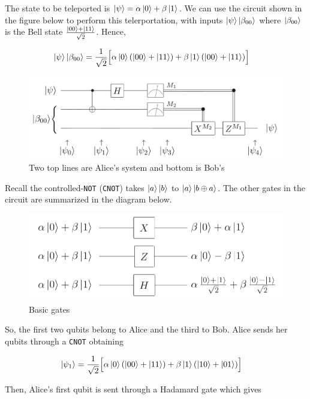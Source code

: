 \documentclass[11pt]{article}
\newcommand\0{\mathbf{0}}
\newcommand\<{\langle}
\renewcommand\>{\rangle}
\begin{document}
The state to be teleported is $\ket{\psi} = \alpha\ket{0} + \beta\ket{1}$. We can use the circuit shown in the figure below to perform this telerportation, with inputs $\ket{\psi} \ket{\beta_{00}}$ where $\ket{\beta_{00}}$ is the Bell state $\frac{\ket{00} + \ket{11} }{\sqrt{2}}$. Hence,

\begin{align*}
	\ket{\psi} \ket{\beta_{00}} &= \frac{1}{\sqrt{2}}\Big[\alpha\ket{0}(\ket{00} + \ket{11}) + \beta\ket{1}(\ket{00} + \ket{11})\Big]
\end{align*}


\begin{figure}[H]
\centering
\includegraphics[width=\linewidth]{teleportation_circuit.png}	
\caption{Two top lines are Alice's system and bottom is Bob's}
\end{figure}

Recall the controlled-\texttt{NOT} (\texttt{CNOT}) takes $\ket{a}\ket{b}$ to $\ket{a}\ket{b \oplus a}$. The other gates in the circuit are summarized in the diagram below.

\begin{figure}[H]
\centering
\includegraphics[width=0.5\linewidth]{basic_gates.png}	
\caption{Basic gates}
\end{figure}

So, the first two qubits belong to Alice and the third to Bob. Alice sends her qubits through a \texttt{CNOT} obtaining

\begin{align*}
\ket{\psi_1} &= \frac{1}{\sqrt{2}}\Big[\alpha\ket{0}(\ket{00} + \ket{11}) + \beta\ket{1}(\ket{10} + \ket{01})\Big]
\end{align*}

Then, Alice's first qubit is sent through a Hadamard gate which gives
\end{document}
